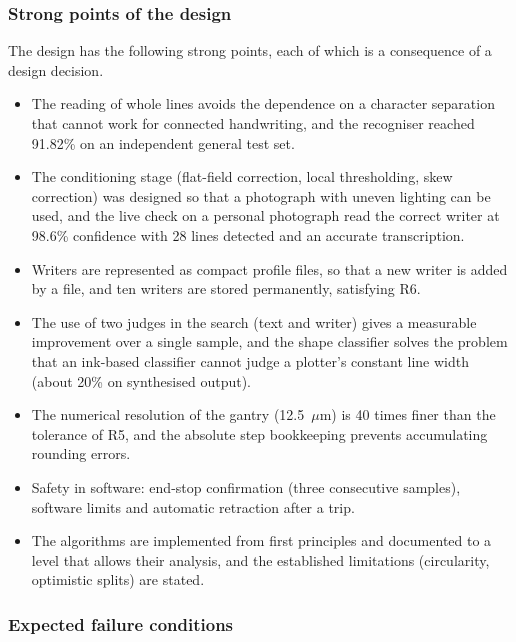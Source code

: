     \subsubsection{Strong points of the design}
    \label{sec:dis-strong}

        The design has the following strong points, each of which is a consequence of a design decision.
        \begin{itemize}
          \item The reading of whole lines avoids the dependence on a character separation that cannot work for connected handwriting, and the recogniser reached 91.82\% on an independent general test set.
          \item The conditioning stage (flat-field correction, local thresholding, skew correction) was designed so that a photograph with uneven lighting can be used, and the live check on a personal photograph read the correct writer at 98.6\% confidence with 28 lines detected and an accurate transcription.
          \item Writers are represented as compact profile files, so that a new writer is added by a file, and ten writers are stored permanently, satisfying R6.
          \item The use of two judges in the search (text and writer) gives a measurable improvement over a single sample, and the shape classifier solves the problem that an ink-based classifier cannot judge a plotter's constant line width (about 20\% on synthesised output).
          \item The numerical resolution of the gantry (12.5~$\mu$m) is 40 times finer than the tolerance of R5, and the absolute step bookkeeping prevents accumulating rounding errors.
          \item Safety in software: end-stop confirmation (three consecutive samples), software limits and automatic retraction after a trip.
          \item The algorithms are implemented from first principles and documented to a level that allows their analysis, and the established limitations (circularity, optimistic splits) are stated.
        \end{itemize}

    \subsubsection{Expected failure conditions}
    \label{sec:dis-failure}

